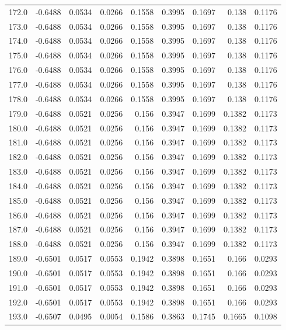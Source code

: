 \begin{longtable}{lrrrrrrrr}
172.0 & -0.6488 & 0.0534 & 0.0266 & 0.1558 & 0.3995 & 0.1697 & 0.138 & 0.1176 \\
173.0 & -0.6488 & 0.0534 & 0.0266 & 0.1558 & 0.3995 & 0.1697 & 0.138 & 0.1176 \\
174.0 & -0.6488 & 0.0534 & 0.0266 & 0.1558 & 0.3995 & 0.1697 & 0.138 & 0.1176 \\
175.0 & -0.6488 & 0.0534 & 0.0266 & 0.1558 & 0.3995 & 0.1697 & 0.138 & 0.1176 \\
176.0 & -0.6488 & 0.0534 & 0.0266 & 0.1558 & 0.3995 & 0.1697 & 0.138 & 0.1176 \\
177.0 & -0.6488 & 0.0534 & 0.0266 & 0.1558 & 0.3995 & 0.1697 & 0.138 & 0.1176 \\
178.0 & -0.6488 & 0.0534 & 0.0266 & 0.1558 & 0.3995 & 0.1697 & 0.138 & 0.1176 \\
179.0 & -0.6488 & 0.0521 & 0.0256 & 0.156 & 0.3947 & 0.1699 & 0.1382 & 0.1173 \\
180.0 & -0.6488 & 0.0521 & 0.0256 & 0.156 & 0.3947 & 0.1699 & 0.1382 & 0.1173 \\
181.0 & -0.6488 & 0.0521 & 0.0256 & 0.156 & 0.3947 & 0.1699 & 0.1382 & 0.1173 \\
182.0 & -0.6488 & 0.0521 & 0.0256 & 0.156 & 0.3947 & 0.1699 & 0.1382 & 0.1173 \\
183.0 & -0.6488 & 0.0521 & 0.0256 & 0.156 & 0.3947 & 0.1699 & 0.1382 & 0.1173 \\
184.0 & -0.6488 & 0.0521 & 0.0256 & 0.156 & 0.3947 & 0.1699 & 0.1382 & 0.1173 \\
185.0 & -0.6488 & 0.0521 & 0.0256 & 0.156 & 0.3947 & 0.1699 & 0.1382 & 0.1173 \\
186.0 & -0.6488 & 0.0521 & 0.0256 & 0.156 & 0.3947 & 0.1699 & 0.1382 & 0.1173 \\
187.0 & -0.6488 & 0.0521 & 0.0256 & 0.156 & 0.3947 & 0.1699 & 0.1382 & 0.1173 \\
188.0 & -0.6488 & 0.0521 & 0.0256 & 0.156 & 0.3947 & 0.1699 & 0.1382 & 0.1173 \\
189.0 & -0.6501 & 0.0517 & 0.0553 & 0.1942 & 0.3898 & 0.1651 & 0.166 & 0.0293 \\
190.0 & -0.6501 & 0.0517 & 0.0553 & 0.1942 & 0.3898 & 0.1651 & 0.166 & 0.0293 \\
191.0 & -0.6501 & 0.0517 & 0.0553 & 0.1942 & 0.3898 & 0.1651 & 0.166 & 0.0293 \\
192.0 & -0.6501 & 0.0517 & 0.0553 & 0.1942 & 0.3898 & 0.1651 & 0.166 & 0.0293 \\
193.0 & -0.6507 & 0.0495 & 0.0054 & 0.1586 & 0.3863 & 0.1745 & 0.1665 & 0.1098 \\

\end{longtable}
